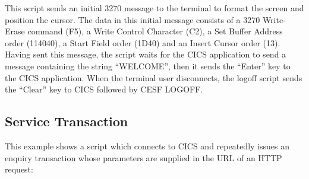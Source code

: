 \documentclass[letterpaper,10pt,english]{sphinxmanual}
\begin{document}

This script sends an initial 3270 message to the terminal to format the screen and position the cursor. The data in this initial message consists of a 3270 Write-Erase command (F5), a Write Control Character (C2), a Set Buffer Address order (114040), a Start Field order (1D40) and an Insert Cursor order (13). Having sent this message, the script waits for the CICS application to send a message containing the string “WELCOME”, then it sends the “Enter” key to the CICS application. When the terminal user disconnects, the logoff script sends the “Clear” key to CICS followed by CESF LOGOFF.


\subsection{Service Transaction}
\label{\detokenize{connectivity_guide:service-transaction}}\label{\detokenize{connectivity_guide:index-128}}
This example shows a script which connects to CICS and repeatedly issues an enquiry transaction whose parameters are supplied in the URL of an HTTP request:

\begin{sphinxVerbatim}[commandchars=\\\{\}]
                          
                         
      
                      
                          
                                 
     
         
\end{sphinxVerbatim}
\end{document}

